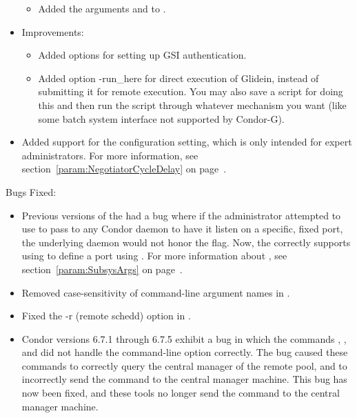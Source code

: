 \begin{itemize}
\begin{itemize}
  \item Added the  arguments  and
   to .

\end{itemize}

\item {} Improvements:

\begin{itemize}

  \item Added  options for setting up GSI authentication.

  \item Added  option {-run\_here} for direct
  execution of Glidein, instead of submitting it for remote execution.
  You may also save a script for doing this and then run the script
  through whatever mechanism you want (like some batch system
  interface not supported by Condor-G).

\end{itemize}

\item Added support for the 
  configuration setting, which is only intended for expert
  administrators.
  For more information, see section~\ref{param:NegotiatorCycleDelay}
  on page~\pageref{param:NegotiatorCycleDelay}.


\end{itemize}

\noindent Bugs Fixed:

\begin{itemize}

\item Previous versions of the  had a bug where if the
  administrator attempted to use  to pass 
  to any Condor daemon to have it listen on a specific, fixed port,
  the underlying daemon would not honor the flag.
  Now, the  correctly supports using
   to define a port using .
  For more information about , see
  section~\ref{param:SubsysArgs} on page~\pageref{param:SubsysArgs}.

\item Removed case-sensitivity of command-line argument names in
.

\item Fixed the {-r} (remote schedd) option in .

\item Condor versions 6.7.1 through 6.7.5 exhibit a bug in
  which the commands , , and
   did not handle the  command-line option
  correctly.
  The bug caused these commands to correctly query the central manager
  of the remote pool,
  and to incorrectly send the command to the central manager machine.
  This bug has now been fixed, and these tools no longer send
  the command to the central manager machine.

\end{itemize}

